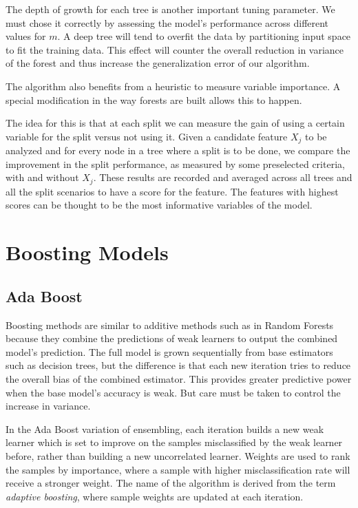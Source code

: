 The depth of growth for each tree is another important tuning parameter. We must chose it correctly by assessing the model's performance across different values for $m$. A deep tree will tend to overfit the data by partitioning input space to fit the training data. This effect will counter the overall reduction in variance of the forest and thus increase the generalization error of our algorithm.


The algorithm also benefits from a heuristic to measure variable importance.
A special modification in the way forests are built allows this to happen.

The idea for this is that at each split we can measure the gain of using a certain variable for the split versus not using it. Given a candidate feature $X_j$ to be analyzed and for every node in a tree where a split is to be done, we compare the improvement in the split performance, as measured by some preselected criteria, with and without $X_j$. These results are recorded and averaged across all trees and all the split scenarios to have a score for the feature. The features with highest scores can be thought to be the most informative variables of the model.


\section{Boosting Models}\label{section-boosting}
\subsection{Ada Boost}

Boosting methods are similar to additive methods such as in Random Forests because they combine the predictions of weak learners to output the combined model's prediction. The full model is grown sequentially from base estimators such as decision trees, but the difference is that each new iteration tries to reduce the overall bias of the combined estimator. This provides greater predictive power when the base model's accuracy is weak. But care must be taken to control the increase in variance.

In the Ada Boost variation of ensembling, each iteration builds a new weak learner which is set to improve on the samples misclassified by the weak learner before, rather than building a new uncorrelated learner. Weights are used to rank the samples by importance, where a sample with higher misclassification rate will receive a stronger weight. The name of the algorithm is derived from the term \textit{adaptive boosting}, where sample weights are updated at each iteration.

